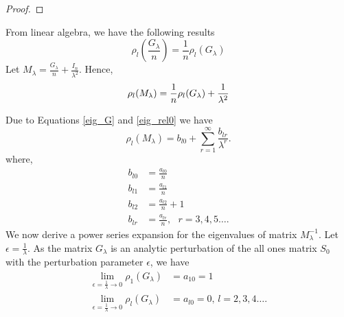\documentclass[multixcb]{amstext-l}
\theoremstyle{plain}
\theoremstyle{definition}
\theoremstyle{definition}
\theoremstyle{remark}
\numberwithin{equation}{chapter}
\begin{document}
\begin{proof}

\end{proof}

From linear algebra, we have the following results
\begin{equation}
    \rho_l(\frac{G_{\lambda}}{n}) = \frac{1}{n}\rho_l(G_{\lambda})
\end{equation}
Let $M_{\lambda} = \frac{G_{\lambda}}{n} + \frac{I_n}{\lambda^2}$.
Hence,
\begin{equation}\label{eig_rel0}
\rho_l(M_{\lambda}) = \frac{1}{n}\rho_l(G_{\lambda}) + \frac{1}{\lambda^2}\\
 \end{equation}
 
 Due to Equations \ref{eig_G} and \ref{eig_rel0} we have
 \begin{equation}\label{eig_rel}
  \rho_l(M_{\lambda}) = b_{l0} + \sum\limits_{r=1}^{\infty}\frac{b_{lr}}{\lambda^r}. 
\end{equation}
where,
\begin{equation}
\begin{aligned}
b_{l0} &= \frac{a_{l0}}{n}\\
b_{l1} &= \frac{a_{l1}}{n}\\
b_{l2} &=  \frac{a_{l2}}{n} + 1\\
b_{lr} &= \frac{a_{lr}}{n},\mbox{     } r=3,4,5\ldots.
\end{aligned}
\end{equation}
We now derive a power series expansion for the eigenvalues of matrix $M_{\lambda}^{-1}$. Let $\epsilon = \frac{1}{\lambda}$. As the matrix $G_{\lambda}$ is an analytic perturbation of the all ones matrix $S_0$ with the perturbation parameter $\epsilon$, we have \begin{equation}\label{egg1}
\begin{aligned}
\lim\limits_{\epsilon = \frac{1}{\lambda}\to 0}\rho_1(G_{\lambda})  &= a_{10} = 1\\
\lim\limits_{\epsilon = \frac{1}{\lambda}\to 0}\rho_l(G_{\lambda})  &= a_{l0} = 0 \mbox{,     } l = 2,3,4\ldots.\\
\end{aligned}
\end{equation}
\end{document}
